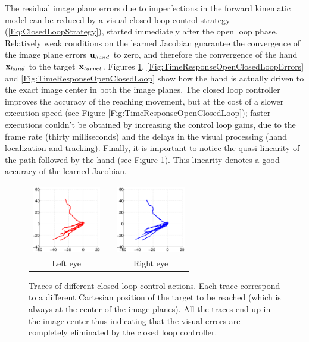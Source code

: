 The residual image plane errors 
due to imperfections in the forward kinematic model can be reduced by a visual closed loop
control strategy (\ref{Eq:ClosedLoopStrategy}), started immediately after the open loop phase. Relatively weak conditions on the learned 
Jacobian \cite{Samson91robot} guarantee the convergence of the image plane errors $\mathbf{u}_{hand}$ to zero, and therefore
the convergence of the hand $\mathbf{x}_{hand}$ to the target $\mathbf{x}_{target}$. Figures
\ref{Fig:ImagePlaneClosedLoopErrors}, %
\ref{Fig:TimeResponseOpenClosedLoopErrors} and \ref{Fig:TimeResponseOpenClosedLoop}  
show how the hand is actually driven to the 
exact image center in both the image planes. The closed loop controller 
improves the accuracy of the reaching movement, but at the cost of a slower 
execution speed (see Figure \ref{Fig:TimeResponseOpenClosedLoop}); faster
executions couldn't be obtained by increasing the control loop gains, due to
the frame rate (thirty milliseconds) and the delays in the visual processing (hand localization and tracking).
Finally, it is important to notice 
the quasi-linearity of the path followed by the hand 
(see Figure \ref{Fig:ImagePlaneClosedLoopErrors}). This linearity denotes 
a good accuracy of the learned Jacobian.

\begin{figure}[th!]
  \begin{center}
	\begin{tabular}{ccc}
	  \parbox{30mm}{\includegraphics[width=30mm]{Figure/LeftEyeClosedLoop.eps}}  & \hspace{.1cm} &
	  \parbox{30mm}{\includegraphics[width=30mm]{Figure/RightEyeClosedLoop.eps}}
	  \\
	  \parbox{30mm}{\centering Left eye } & \hspace{0.1cm} & \parbox{30mm}{\centering Right eye }
  \end{tabular}
\end{center}
\caption{Traces of different closed loop control actions. Each trace correspond to a different Cartesian position of the target to be reached (which 
is always at the center of the image planes). All the traces end up in the image center thus indicating that the visual errors are completely eliminated by the closed loop controller.}\label{Fig:ImagePlaneClosedLoopErrors}
  \end{figure}

